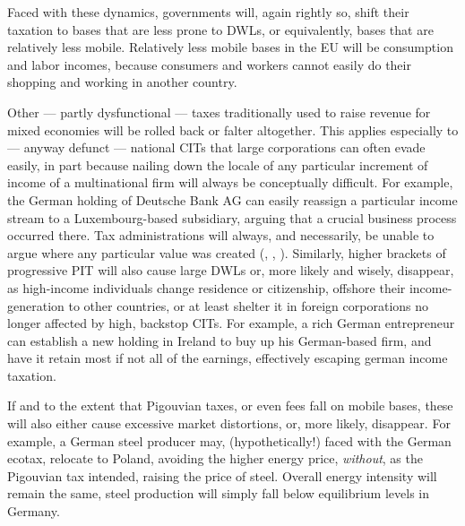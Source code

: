 Faced with these dynamics, governments will, again rightly so, shift their taxation to bases that are less prone to \glspl{DWL}, or equivalently, bases that are relatively less mobile.
Relatively less mobile bases in the \gls{EU} will be consumption and labor incomes, because consumers and workers cannot easily do their shopping and working in another country.

Other --- partly dysfunctional --- taxes traditionally used to raise revenue for mixed economies will be rolled back or falter altogether.
This applies especially to --- anyway defunct --- national \glspl{CIT} that large corporations can often evade easily, in part because nailing down the locale of any particular increment of income of a multinational firm will always be conceptually difficult.
For example, the German holding of Deutsche Bank AG can easily reassign a particular income stream to a Luxembourg-based subsidiary, arguing that a crucial business process occurred there.
Tax administrations will always, and necessarily, be unable to argue where any particular value was created (\citealt{Ganghof2006}, \citealt{Ganghof}, \citealt[5]{Ganghof2007}).
Similarly, higher brackets of progressive \gls{PIT} will also cause large \glspl{DWL} or, more likely and wisely, disappear, as high-income individuals change residence or citizenship, offshore their income-generation to other countries, or at least shelter it in foreign corporations no longer affected by high, backstop \glspl{CIT}.
For example, a rich German entrepreneur can establish a new holding in Ireland to buy up his German-based firm, and have it retain most if not all of the earnings, effectively escaping german income taxation.

If and to the extent that Pigouvian taxes, or even fees fall on mobile bases, these will also either cause excessive market distortions, or, more likely, disappear.
For example, a German steel producer may, (hypothetically!) faced with the German ecotax, relocate to Poland, avoiding the higher energy price, \emph{without}, as the Pigouvian tax intended, raising the price of steel.
Overall energy intensity will remain the same, steel production will simply fall below equilibrium levels in Germany.

